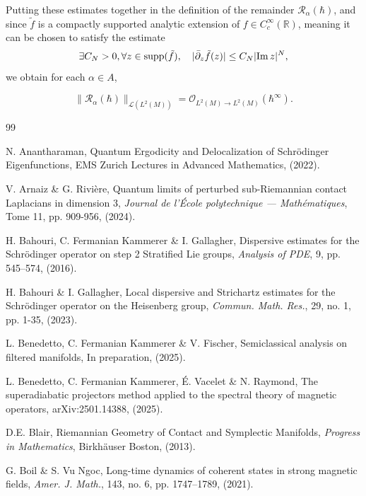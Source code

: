 \documentclass[12pt,a4paper]{amsart}
\theoremstyle{plain}
\theoremstyle{definition}
\theoremstyle{remark}
\numberwithin{equation}{section}
\theoremstyle{definition}
\def\R{{\mathbb R}}%
\def \supp {{\rm supp}}
\def \O{\mathscr{O}}
\numberwithin{equation}{section}
\begin{document}
Putting these estimates together in the definition of the remainder $\mathcal{R}_\alpha(\hbar)$, and since $\tilde{f}$ is a compactly supported analytic extension of $f\in C_c^\infty(\R)$, meaning it can be chosen to satisfy the estimate
\begin{equation*}
    \exists C_N>0,\forall z\in\supp(\tilde{f}),\quad|\Bar{\partial}_z \tilde{f}(z)|\leq C_N |{\rm Im}\,z|^N,
\end{equation*}
we obtain for each $\alpha\in A$,

\begin{equation*}
    \|\mathcal{R}_\alpha(\hbar)\|_{\mathcal{L}(L^2(M))} = \O_{L^2(M)\rightarrow L^2(M)}(\hbar^\infty).
\end{equation*}


\begin{thebibliography}{99}

 N. Anantharaman, Quantum Ergodicity and Delocalization of Schrödinger Eigenfunctions, EMS Zurich Lectures in Advanced Mathematics, (2022). 

 V. Arnaiz \& G. Rivière, Quantum limits of perturbed sub-Riemannian contact Laplacians in dimension 3, {\it Journal de l’École polytechnique — Mathématiques}, Tome 11, pp. 909-956, (2024).

 H. Bahouri, C. Fermanian Kammerer \& I. Gallagher, Dispersive estimates for the Schrödinger operator on step 2 Stratified Lie groups,  {\it Analysis of PDE}, 9, pp. 545–574, (2016).

 H. Bahouri \& I. Gallagher, Local dispersive and Strichartz estimates for the Schrödinger operator on the Heisenberg group, {\it Commun. Math. Res.}, 29, no. 1, pp. 1-35, (2023).

 L. Benedetto, C. Fermanian Kammerer \& V. Fischer, {Semiclassical analysis on filtered manifolds}, In preparation, (2025).

 L. Benedetto, C. Fermanian Kammerer, É. Vacelet \& N. Raymond, The superadiabatic projectors method applied to the spectral theory of magnetic operators, arXiv:2501.14388, (2025).

 D.E. Blair, Riemannian Geometry of Contact and Symplectic Manifolds, {\it Progress in Mathematics}, Birkh{\"a}user Boston, (2013).

 G. Boil \& S. Vu Ngoc, Long-time dynamics of coherent states in strong magnetic fields, {\it Amer. J. Math.}, 143, no. 6, pp. 1747–1789, (2021).


\end{thebibliography}
\end{document}
